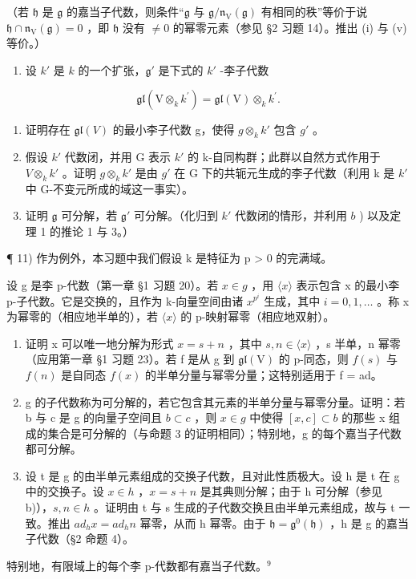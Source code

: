 （若 \(\mathfrak{h}\) 是 \(\mathfrak{g}\) 的嘉当子代数，则条件“\(\mathfrak{g}\) 与 \(\mathfrak{g}/\mathfrak{n}_{\mathrm{V}}(\mathfrak{g})\) 有相同的秩”等价于说 \(\mathfrak{h} \cap \mathfrak{n}_{\mathrm{V}}(\mathfrak{g}) = 0\) ，即 \(\mathfrak{h}\) 没有 \(\neq 0\) 的幂零元素（参见 §2 习题 14）。推出 (i) 与 (v) 等价。）

\begin{enumerate}
\def\labelenumi{\arabic{enumi})}
\setcounter{enumi}{9}
\tightlist
\item
  设 \(k'\) 是 \(k\) 的一个扩张，\(\mathfrak{g}'\) 是下式的 \(k'\) -李子代数
\end{enumerate}

\[
\mathfrak {g l} (\mathrm{V} \otimes_ {k} k ^ {\prime}) = \mathfrak {g l} (\mathrm{V}) \otimes_ {k} k ^ {\prime}.
\]

\begin{enumerate}
\def\labelenumi{\alph{enumi})}
\item
  证明存在 \(\mathfrak{gl}(V)\) 的最小李子代数 g，使得 \(g\otimes_{k}k'\) 包含 \(g'\) 。
\item
  假设 \(k'\) 代数闭，并用 G 表示 \(k'\) 的 k-自同构群；此群以自然方式作用于 \(V \otimes_{k} k'\) 。证明 \(g \otimes_{k} k'\) 是由 \(g'\) 在 G 下的共轭元生成的李子代数（利用 k 是 \(k'\) 中 G-不变元所成的域这一事实）。
\item
  证明 \(\mathfrak{g}\) 可分解，若 \(\mathfrak{g}'\) 可分解。（化归到 \(k'\) 代数闭的情形，并利用 \(b\) ) 以及定理 1 的推论 1 与 3。）
\end{enumerate}

¶ 11) 作为例外，本习题中我们假设 k 是特征为 p \textgreater{} 0 的完满域。

设 g 是李 p-代数（第一章 §1 习题 20）。若 \(x \in g\) ，用 \(\langle x \rangle\) 表示包含 x 的最小李 p-子代数。它是交换的，且作为 k-向量空间由诸 \(x^{p^{i}}\) 生成，其中 \(i = 0, 1, \ldots\) 。称 x 为幂零的（相应地半单的），若 \(\langle x \rangle\) 的 p-映射幂零（相应地双射）。

\begin{enumerate}
\def\labelenumi{\alph{enumi})}
\item
  证明 x 可以唯一地分解为形式 \(x = s + n\) ，其中 \(s, n \in \langle x \rangle\) ，s 半单，n 幂零（应用第一章 §1 习题 23）。若 f 是从 g 到 \(\mathfrak{gl}(\mathrm{V})\) 的 p-同态，则 \(f(s)\) 与 \(f(n)\) 是自同态 \(f(x)\) 的半单分量与幂零分量；这特别适用于 f = ad。
\item
  g 的子代数称为可分解的，若它包含其元素的半单分量与幂零分量。证明：若 b 与 c 是 g 的向量子空间且 \(b \subset c\) ，则 \(x \in g\) 中使得 \([x, c] \subset b\) 的那些 x 组成的集合是可分解的（与命题 3 的证明相同）；特别地，g 的每个嘉当子代数都可分解。
\item
  设 t 是 g 的由半单元素组成的交换子代数，且对此性质极大。设 h 是 t 在 g 中的交换子。设 \(x \in h\) ，\(x = s + n\) 是其典则分解；由于 h 可分解（参见 b)），\(s, n \in h\) 。证明由 t 与 s 生成的子代数交换且由半单元素组成，故与 t 一致。推出 \(ad_{h}x = ad_{h}n\) 幂零，从而 h 幂零。由于 \(\mathfrak{h} = \mathfrak{g}^{0}(\mathfrak{h})\) ，h 是 g 的嘉当子代数（§2 命题 4）。
\end{enumerate}

特别地，有限域上的每个李 p-代数都有嘉当子代数。\(^{9}\)


